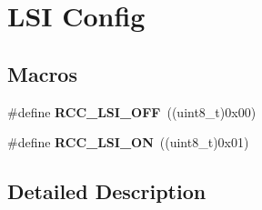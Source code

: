 \hypertarget{group___r_c_c___l_s_i___config}{}\section{L\+SI Config}
\label{group___r_c_c___l_s_i___config}
\subsection*{Macros}
\begin{DoxyCompactItemize}
\item 
\mbox{\label{group___r_c_c___l_s_i___config_gaa1710927d79a2032f87f039c4a27356a}} 
\#define {\bfseries R\+C\+C\+\_\+\+L\+S\+I\+\_\+\+O\+FF}~((uint8\+\_\+t)0x00)
\item 
\mbox{\label{group___r_c_c___l_s_i___config_ga6b364ac3500e60b6bff695ee518c87d6}} 
\#define {\bfseries R\+C\+C\+\_\+\+L\+S\+I\+\_\+\+ON}~((uint8\+\_\+t)0x01)
\end{DoxyCompactItemize}


\subsection{Detailed Description}
